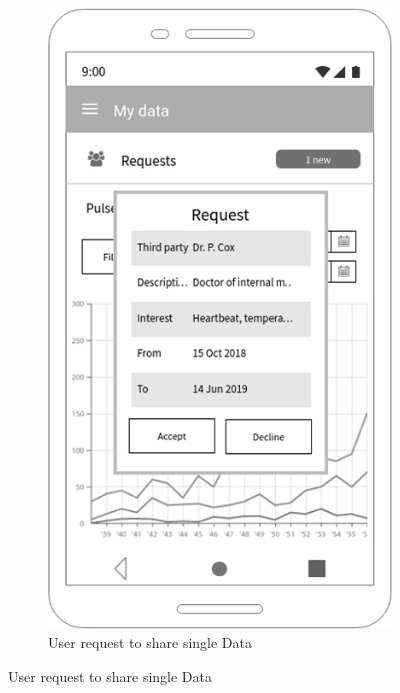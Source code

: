 \clearpage

\begin{figure}[h!]

 \centering

  \begin{subfigure}[b]{0.25\linewidth}

    \includegraphics[width=\linewidth]{img/mockup/u_request.jpg}

    \caption{User request to share single Data}


\end{subfigure}
\end{figure}
